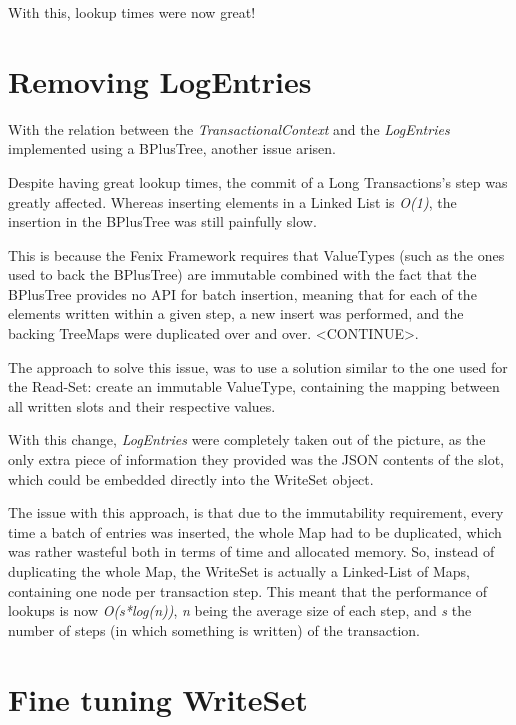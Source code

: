 With this, lookup times were now great!

\section{Removing LogEntries}

With the relation between the {\it TransactionalContext} and the {\it
  LogEntries} implemented using a BPlusTree, another issue arisen. 

Despite having great lookup times, the commit of a Long Transactions's
step was greatly affected. Whereas inserting elements in a Linked List
is {\it O(1)}, the insertion in the BPlusTree was still painfully
slow.

This is because the Fenix Framework requires that ValueTypes (such as
the ones used to back the BPlusTree) are immutable combined with the
fact that the BPlusTree provides no API for batch insertion, meaning
that for each of the elements written within a given step, a new
insert was performed, and the backing TreeMaps were duplicated over
and over. <CONTINUE>.

The approach to solve this issue, was to use a solution similar to the
one used for the Read-Set: create an immutable ValueType, containing
the mapping between all written slots and their respective values.

With this change, {\it LogEntries} were completely taken out of the
picture, as the only extra piece of information they provided was the
JSON contents of the slot, which could be embedded directly into the
WriteSet object.

The issue with this approach, is that due to the immutability
requirement, every time a batch of entries was inserted, the whole Map
had to be duplicated, which was rather wasteful both in terms of time
and allocated memory. So, instead of duplicating the whole Map, the
WriteSet is actually a Linked-List of Maps, containing one node per
transaction step. This meant that the performance of lookups is now
{\it O(s*log(n))}, {\it n} being the average size of each step, and
{\it s} the number of steps (in which something is written) of the
transaction.

\section{Fine tuning WriteSet}

